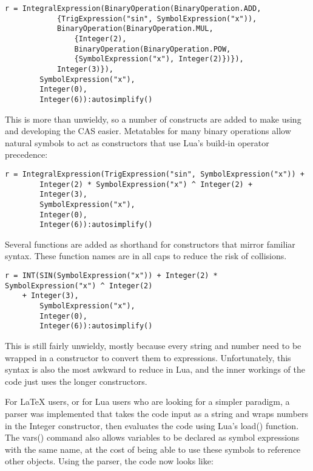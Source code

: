 \documentclass{article}
\begin{document}
\begin{verbatim}
r = IntegralExpression(BinaryOperation(BinaryOperation.ADD,
            {TrigExpression("sin", SymbolExpression("x")),
            BinaryOperation(BinaryOperation.MUL,
                {Integer(2),
                BinaryOperation(BinaryOperation.POW,
                {SymbolExpression("x"), Integer(2)})}),
            Integer(3)}),
        SymbolExpression("x"),
        Integer(0),
        Integer(6)):autosimplify()
\end{verbatim}

This is more than unwieldy, so a number of constructs are added to make using and developing the CAS easier. Metatables for many binary operations allow natural symbols to act as constructors that use Lua's build-in operator precedence:

\begin{verbatim}
r = IntegralExpression(TrigExpression("sin", SymbolExpression("x")) +
        Integer(2) * SymbolExpression("x") ^ Integer(2) +
        Integer(3),
        SymbolExpression("x"),
        Integer(0),
        Integer(6)):autosimplify()
\end{verbatim}

Several functions are added as shorthand for constructors that mirror familiar syntax. These function names are in all caps to reduce the risk of collisions.

\begin{verbatim}
r = INT(SIN(SymbolExpression("x")) + Integer(2) * SymbolExpression("x") ^ Integer(2) 
    + Integer(3),
        SymbolExpression("x"),
        Integer(0),
        Integer(6)):autosimplify()
\end{verbatim}

This is still fairly unwieldy, mostly because every string and number need to be wrapped in a constructor to convert them to expressions. Unfortunately, this syntax is also the most awkward to reduce in Lua, and the inner workings of the code just uses the longer constructors.

For \LaTeX{} users, or for Lua users who are looking for a simpler paradigm, a parser was implemented that takes the code input as a string and wraps numbers in the {\ttfamily Integer} constructor, then evaluates the code using Lua's {\ttfamily load()} function. The {\ttfamily vars()} command also allows variables to be declared as symbol expressions with the same name, at the cost of being able to use these symbols to reference other objects. Using the parser, the code now looks like:
\end{document}
